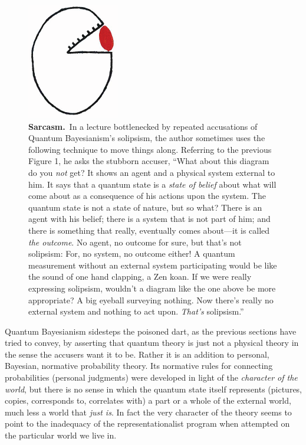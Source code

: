 \begin{figure}
\begin{center}
\includegraphics[height=2.0in]{sarcasm3.eps}
\bigskip\caption{\protect\small {\bf Sarcasm.}~In a lecture bottlenecked by repeated accusations of Quantum Bayesianism's solipsism, the author sometimes uses the following technique to move things along. Referring to the previous Figure 1, he asks the stubborn accuser, ``What about this diagram do you {\it not\/} get?  It shows an agent and a physical system external to him.  It says that a quantum state is a {\it state of belief\/} about what will come about as a consequence of his actions upon the system.   The quantum state is not a state of nature, but so what?  There is an agent with his belief; there is a system that is not part of him; and there is something that really, eventually comes about---it is called {\it the outcome}.  No agent, no outcome for sure, but that's not solipsism:  For, no system, no outcome either!  A quantum measurement without an external system participating would be like the sound of one hand clapping, a Zen koan.  If we were really expressing solipsism, wouldn't a diagram like the one above be more appropriate?  A big eyeball surveying nothing.  Now there's really no external system and nothing to act upon. {\it That's\/} solipsism.''}
\end{center}
\end{figure}

Quantum Bayesianism sidesteps the poisoned dart, as the previous sections have tried to convey, by asserting that quantum theory is just not a physical theory in the sense the accusers want it to be.  Rather it is an addition to personal, Bayesian, normative probability theory.  Its normative rules for connecting probabilities (personal judgments) were developed in light of the {\it character of the world}, but there is no sense in which the quantum state itself represents (pictures, copies, corresponds to, correlates with) a part or a whole of the external world, much less a world that {\it just is}.  In fact the very character of the theory seems to point to the inadequacy of the representationalist program when attempted on the particular world we live in.

